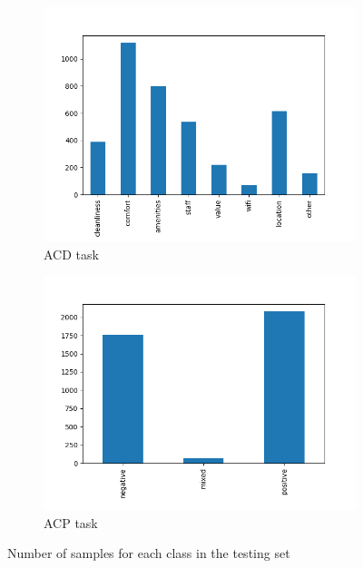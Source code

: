 \documentclass{article}
\begin{document}
            \begin{figure}
		    \centering
		    \begin{subfigure}{.5\textwidth}
  		        \centering
 		        \includegraphics[width=\textwidth]{imgs/acd_y_test_historgram.png}
  		        \caption{ACD task}
  		        \label{acd_y_test_historgram}
		    \end{subfigure}%
		    \begin{subfigure}{.5\textwidth}
 		        \centering
 		        \includegraphics[width=\textwidth]{imgs/acp_y_test_historgram.png}
 		        \caption{ACP task}
 		        \label{acp_y_test_historgram}
		    \end{subfigure}
		    \caption{Number of samples for each class in the testing set}
		    \label{y_test_histograms}
	    \end{figure}
\end{document}
